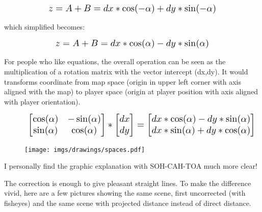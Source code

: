 \begin{figure}[H]
  \centering
  \begin{equation*}
    \scalebox{1.3}{
$z = A + B = dx * \cos(-\alpha) + dy * \sin(-\alpha) $ 
 }
  \end{equation*}
\end{figure}
which simplified becomes: 

\begin{figure}[H]
  \centering
  \begin{equation*}
    \scalebox{1.3}{
$z = A + B = dx * \cos(\alpha) - dy * \sin(\alpha) $
 }
  \end{equation*}
\end{figure}
\par
For people who like equations, the overall operation can be seen as the multiplication of a rotation matrix with the vector intercept (dx,dy). It would transforms coordinate from map space (origin in upper left corner with axis aligned with the map) to player space (origin at player position with axis aligned with player orientation).
\begin{figure}[H]
  \centering
  \begin{equation*}
    \scalebox{1.3}{
    $
      \begin{bmatrix} 
        \cos(\alpha) & -\sin(\alpha) \\ 
        \sin(\alpha) & \cos(\alpha) 
      \end{bmatrix} 
       *
      \begin{bmatrix} 
        dx \\ 
        dy 
      \end{bmatrix}
       =
      \begin{bmatrix} 
        dx*\cos(\alpha) - dy*\sin(\alpha) \\ 
        dx*\sin(\alpha) + dy*\cos(\alpha) 
      \end{bmatrix} 
      $
    }
  \end{equation*}
\end{figure}

\begin{figure}[H]
\centering
 \texttt{[image: imgs/drawings/spaces.pdf]}
 \end{figure}


I personally find the graphic explanation with SOH-CAH-TOA much more clear!\\
\par
The correction is enough to give pleasant straight lines. To make the difference vivid, here are a few pictures showing the same scene, first uncorrected (with fisheyes) and the same scene with projected distance instead of direct distance.\\

